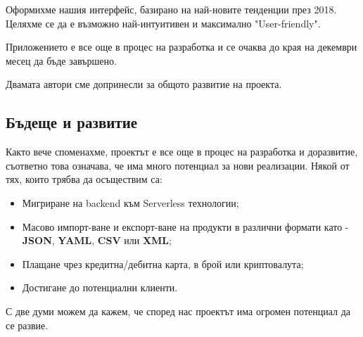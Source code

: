 \documentclass[a4paper]{article}
\begin{document}
\begin{Large}
Оформихме нашия интерфейс, базирано на най-новите тенденции през 2018. Целяхме се да е възможно най-интуитивен и максимално "User-friendly".

Приложението е все още в процес на разработка и се очаква до края на декември месец да бъде завършено. 

Двамата автори сме допринесли за общото развитие на проекта. 

\subsection{Бъдеще и развитие}

Както вече споменахме, проектът е все още в процес на разработка и доразвитие, съответно това означава, че има много потенциал за нови реализации. Някой от тях, които трябва да осъществим са:

\begin{itemize}
\item Мигриране на backend към Serverless технологии; \unsure
\item Масово импорт-ване и експорт-ване на продукти в различни формати като - \textbf{JSON}, \textbf{YAML}, \textbf{CSV} или \textbf{XML};
\item Плащане чрез кредитна/дебитна карта, в брой или криптовалута;
\item Достигане до потенциални клиенти.
\end{itemize}

С две думи можем да кажем, че според нас проектът има огромен
потенциал да се развие.

\end{Large}
\end{document}
